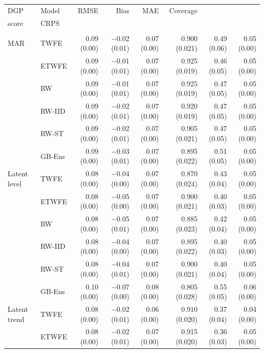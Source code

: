 \begin{table}
\fontsize{9.0pt}{11.0pt}\selectfont\setlength\tabcolsep{3.5pt}
\begin{tabular*}{1\linewidth}{@{\extracolsep{\fill}}llrrrrrr}
\toprule
DGP & Model & RMSE & Bias & MAE & Coverage & \begin{tabular}[b]{@{}r@{}}Interval\\score\end{tabular} & CRPS \\ 
\midrule\addlinespace[2.5pt]
\multicolumn{8}{l}{Without covariates, event year 0} \\[2.5pt] 
\midrule\addlinespace[2.5pt]
MAR & TWFE & 0.09 (0.00) & −0.02 (0.01) & 0.07 (0.00) & 0.900 (0.021) & 0.49 (0.06) & 0.05 (0.00) \\ 
 & ETWFE & 0.09 (0.00) & −0.01 (0.01) & 0.07 (0.00) & 0.925 (0.019) & 0.46 (0.05) & 0.05 (0.00) \\ 
 & RW & 0.09 (0.00) & −0.01 (0.01) & 0.07 (0.00) & 0.925 (0.019) & 0.47 (0.05) & 0.05 (0.00) \\ 
 & RW-IID & 0.09 (0.00) & −0.02 (0.01) & 0.07 (0.00) & 0.920 (0.019) & 0.47 (0.05) & 0.05 (0.00) \\ 
 & RW-ST & 0.09 (0.00) & −0.02 (0.01) & 0.07 (0.00) & 0.905 (0.021) & 0.47 (0.05) & 0.05 (0.00) \\ 
 & GB-Ens & 0.09 (0.00) & −0.03 (0.01) & 0.07 (0.00) & 0.895 (0.022) & 0.51 (0.05) & 0.05 (0.00) \\ 
Latent level & TWFE & 0.08 (0.00) & −0.04 (0.00) & 0.07 (0.00) & 0.870 (0.024) & 0.43 (0.04) & 0.05 (0.00) \\ 
 & ETWFE & 0.08 (0.00) & −0.05 (0.00) & 0.07 (0.00) & 0.900 (0.021) & 0.40 (0.03) & 0.05 (0.00) \\ 
 & RW & 0.08 (0.00) & −0.05 (0.01) & 0.07 (0.00) & 0.885 (0.023) & 0.42 (0.04) & 0.05 (0.00) \\ 
 & RW-IID & 0.08 (0.00) & −0.04 (0.00) & 0.07 (0.00) & 0.895 (0.022) & 0.40 (0.03) & 0.05 (0.00) \\ 
 & RW-ST & 0.08 (0.00) & −0.04 (0.01) & 0.07 (0.00) & 0.900 (0.021) & 0.40 (0.04) & 0.05 (0.00) \\ 
 & GB-Ens & 0.10 (0.00) & −0.07 (0.00) & 0.08 (0.00) & 0.805 (0.028) & 0.55 (0.05) & 0.06 (0.00) \\ 
Latent trend & TWFE & 0.08 (0.00) & −0.02 (0.01) & 0.06 (0.00) & 0.910 (0.020) & 0.37 (0.04) & 0.04 (0.00) \\ 
 & ETWFE & 0.08 (0.00) & −0.02 (0.01) & 0.07 (0.00) & 0.915 (0.020) & 0.36 (0.03) & 0.05 (0.00) \\ 

\end{tabular*}
\end{table}
